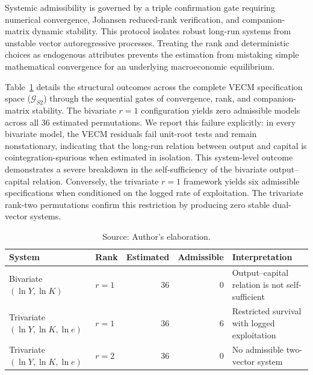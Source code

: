 \documentclass[11pt]{article}
\begin{document}
Systemic admissibility is governed by a triple confirmation gate requiring numerical convergence, Johansen reduced-rank verification, and companion-matrix dynamic stability. This protocol isolates robust long-run systems from unstable vector autoregressive processes. Treating the rank and deterministic choices as endogenous attributes prevents the estimation from mistaking simple mathematical convergence for an underlying macroeconomic equilibrium.

Table~\ref{tab:s2_admissibility_outcomes} details the structural outcomes across the complete VECM specification space ($\mathcal{G}_{S2}$) through the sequential gates of convergence, rank, and companion-matrix stability. The bivariate $r=1$ configuration yields zero admissible models across all 36 estimated permutations. We report this failure explicitly: in every bivariate model, the VECM residuals fail unit-root tests and remain nonstationary, indicating that the long-run relation between output and capital is cointegration-spurious when estimated in isolation. This system-level outcome demonstrates a severe breakdown in the self-sufficiency of the bivariate output--capital relation. Conversely, the trivariate $r=1$ framework yields six admissible specifications when conditioned on the logged rate of exploitation. The trivariate rank-two permutations confirm this restriction by producing zero stable dual-vector systems.

\begin{table}[H]
\centering
\caption{S2 System Admissibility Outcomes}
\label{tab:s2_admissibility_outcomes}
\small
\begin{tabular}{llrrp{5.0cm}}
\toprule
System & Rank & Estimated & Admissible & Interpretation \\
\midrule
\midrule
Bivariate $(\ln Y,\ln K)$ & $r=1$ & 36 & 0 & Output--capital relation is not self-sufficient \\
Trivariate $(\ln Y,\ln K,\ln e)$ & $r=1$ & 36 & 6 & Restricted survival with logged exploitation \\
Trivariate $(\ln Y,\ln K,\ln e)$ & $r=2$ & 36 & 0 & No admissible two-vector system \\
\bottomrule
\end{tabular}
\caption*{Source: Author's elaboration.}
\end{table}
\end{document}
